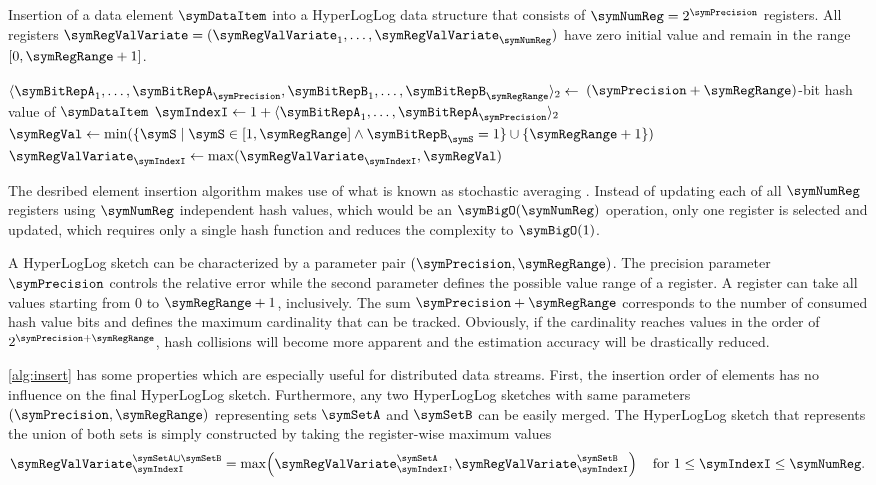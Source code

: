 \documentclass[a4paper]{scrartcl}
\newcommand{\comm}[2]{{\Comment{\parbox[t]{#1\linewidth}{{#2}}}}}
\begin{document}
\begin{algorithm}
\caption{Insertion of a data element $\symDataItem$ into a HyperLogLog data structure that consists of $\symNumReg=2^\symPrecision$ registers. All registers $\boldsymbol{\symRegValVariate} = (\symRegValVariate_1,\ldots,\symRegValVariate_\symNumReg)$ have zero initial value and remain in the range $[0, \symRegRange+1]$.}
\label{alg:insert}
\begin{algorithmic}
\State $\langle \symBitRepA_1, \ldots, \symBitRepA_\symPrecision,\symBitRepB_1,\ldots,\symBitRepB_\symRegRange\rangle_2 \gets$ $(\symPrecision + \symRegRange)$-bit hash value of $\symDataItem$
\comm{0.2}{$\symBitRepA_\symIndexI,\symBitRepB_\symIndexI\in\{0,1\}$}
\State $\symIndexI \gets 1+ \langle \symBitRepA_1, \ldots, \symBitRepA_\symPrecision\rangle_2$
\comm{0.2}{$\symIndexI\in[1,2^\symPrecision]$}
\State $\symRegVal \gets \min(\{\symS\mid \symS \in [1, \symRegRange]  \wedge  \symBitRepB_\symS = 1\}\cup {\{\symRegRange+1\}} )$
\comm{0.2}{$\symRegVal\in[1,\symRegRange+1]$}
\State $\symRegValVariate_\symIndexI \gets\max(\symRegValVariate_\symIndexI, \symRegVal)$
\EndProcedure
\end{algorithmic}
\end{algorithm}

The desribed element insertion algorithm makes use of what is known as stochastic averaging \cite{Flajolet1985}. Instead of updating each of all $\symNumReg$ registers using $\symNumReg$ independent hash values, which would be an $\symBigO(\symNumReg)$ operation, only one register is selected and updated, which requires only a single hash function and reduces the complexity to $\symBigO(1)$.

A HyperLogLog sketch can be characterized by a parameter pair $(\symPrecision, \symRegRange)$. The precision parameter $\symPrecision$ controls the relative error while the second parameter defines the possible value range of a register. A register can take all values starting from 0 to $\symRegRange+1$, inclusively. The sum $\symPrecision+\symRegRange$ corresponds to the number of consumed hash value bits and defines the maximum cardinality that can be tracked. Obviously, if the cardinality reaches values in the order of $2^{\symPrecision+\symRegRange}$, hash collisions will become more apparent and the estimation accuracy will be drastically reduced.

\cref{alg:insert} has some properties which are especially useful for distributed data streams. First, the insertion order of elements has no influence on the final HyperLogLog sketch. Furthermore, any two HyperLogLog sketches with same parameters $(\symPrecision, \symRegRange)$ representing sets $\symSetA$ and $\symSetB$ can be easily merged. The HyperLogLog sketch that represents the union of both sets is simply constructed by taking the register-wise maximum values
\begin{equation}
\label{equ:hll_union}
\symRegValVariate^{\symSetA\cup\symSetB}_{\symIndexI} = 
\max
\!
\left(
\symRegValVariate^{\symSetA}_{\symIndexI},
\symRegValVariate^{\symSetB}_{\symIndexI}
\right)
\quad
\text{for $1\leq\symIndexI\leq\symNumReg$}.
\end{equation}
\end{document}
